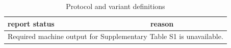 \begin{table}[htbp]
\centering
\caption{Protocol and variant definitions}
\label{tab:s1}
\begin{tabular}{ll}
\hline
report status & reason \\
\hline
\multicolumn{2}{l}{Required machine output for Supplementary Table S1 is unavailable.} \\
\hline
\end{tabular}
\end{table}
